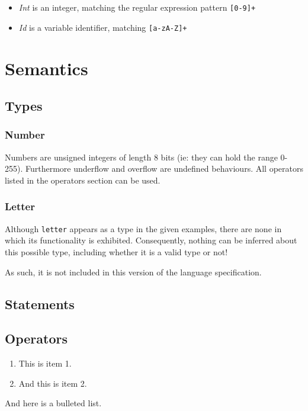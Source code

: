 \documentclass[a4wide, 11pt]{article}
\begin{document}
\begin{itemize}
\item \emph{Int} is an integer, matching the regular expression pattern \verb:[0-9]+:
\item \emph{Id} is a variable identifier, matching \verb:[a-zA-Z]+:
\end{itemize}

\section{Semantics}
\subsection{Types}
\subsubsection{Number}
Numbers are unsigned integers of length 8 bits (ie: they can hold the range
0-255). Furthermore underflow and overflow are undefined behaviours. All
operators listed in the operators section can be used.

\subsubsection{Letter}
Although \verb:letter: appears as a type in the given examples, there are none
in which its functionality is exhibited. Consequently, nothing can be inferred
about this possible type, including whether it is a valid type or not!

As such, it is not included in this version of the language specification.

\subsection{Statements}
\subsection{Operators}


\begin{enumerate}

    \item
    This is item 1.
    
    \item
    And this is item 2.
    
\end{enumerate}

And here is a bulleted list.
\end{document}

